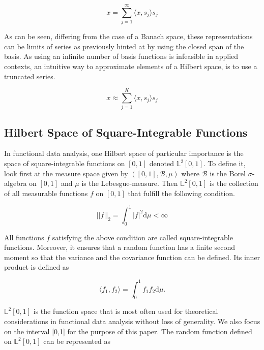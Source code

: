\documentclass[11pt,twoside,a4paper]{article}
\begin{document}
	\begin{equation}
		x = \sum_{j = 1}^{\infty}{\langle x, s_j \rangle}s_j
	\end{equation}
	
	As can be seen, differing from the case of a Banach space, these representations can be limits of series as previously hinted at by using the closed span of the basis. As using an infinite number of basis functions is infeasible in applied contexts, an intuitive way to approximate elements of a Hilbert space, is to use a truncated series.
	
	\begin{equation}
		x \approx \sum_{j = 1}^{K}{\langle x, s_j \rangle}s_j
	\end{equation}
	
	\subsection{Hilbert Space of Square-Integrable Functions}
	In functional data analysis, one Hilbert space of particular importance is the space of square-integrable functions on $[0,1]$ denoted $\mathbb{L}^2[0,1]$. To define it, look first at the measure space given by $([0,1], \mathcal{B}, \mu)$ where $\mathcal{B}$ is the Borel $\sigma$-algebra on $[0,1]$ and $\mu$ is the Lebesgue-measure. Then $\mathbb{L}^2[0,1]$ is the collection of all measurable functions $f$ on $[0,1]$ that fulfill the following condition.
	
	\begin{equation}
		\lvert \lvert f \rvert \rvert_2 = \int_{0}^{1} \lvert f \rvert^2 \mathrm{d}\mu < \infty
	\end{equation}
	
	All functions $f$ satisfying the above condition are called square-integrable functions. Moreover, it ensures that a random function has a finite second moment so that the variance and the covariance function can be defined. Its inner product is defined as
	
	\begin{equation}
		\langle f_1, f_2 \rangle = \int_{0}^{1} f_1 f_2 \mathrm{d}\mu.
	\end{equation}
	
	$\mathbb{L}^2[0,1]$ is the function space that is most often used for theoretical considerations in functional data analysis without loss of generality. We also focus on the interval [0,1] for the purpose of this paper.	The random function defined on $\mathbb{L}^2[0,1]$ can be represented as
	
\end{document}
